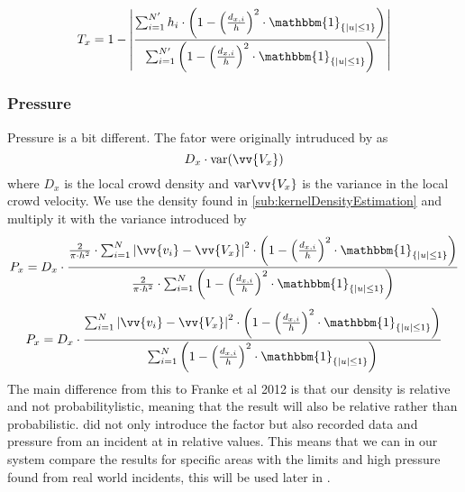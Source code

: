 \begin{equation}
\label{eq:}
T_x = 1 - \left|\frac{\sum_{i=1}^{N'} h_i \cdot \left(1-\left(\frac{d_{x,i}}{h}\right)^2 \cdot \mathbbm{1}_{\{|u| \leq 1\} }\right)}{\sum_{i=1}^{N'} \left(1-\left(\frac{d_{x,i}}{h}\right)^2 \cdot \mathbbm{1}_{\{|u| \leq 1\} }\right)}\right|
\end{equation}

\subsubsection{Pressure}
Pressure is a bit different. The fator were originally intruduced by \citet{empircalstudy} as 
\begin{equation}
D_x \cdot \text{var}(\vv{V_x})
\end{equation}
where $D_x$ is the local crowd density and $\text{var}\vv{V_x}$ is the variance in the local crowd velocity. We use the density found in \cref{sub:kernelDensityEstimation} and multiply it with the variance introduced by \citet{wirz2012inferring}
\begin{equation}
\label{eq:}
P_x = D_x \cdot \frac{\frac{2}{\pi \cdot h^2} \cdot \sum_{i=1}^{N} \left|\vv{v_i} - \vv{V_x}\right|^2 \cdot \left(1-\left(\frac{d_{x,i}}{h}\right)^2 \cdot \mathbbm{1}_{\{|u| \leq 1\} }\right)}{\frac{2}{\pi \cdot h^2} \cdot \sum_{i=1}^{N} \left(1-\left(\frac{d_{x,i}}{h}\right)^2 \cdot \mathbbm{1}_{\{|u| \leq 1\} }\right)}
\end{equation}
\begin{equation}
\label{eq:}
P_x = D_x \cdot \frac{\sum_{i=1}^{N} \left|\vv{v_i} - \vv{V_x}\right|^2 \cdot \left(1-\left(\frac{d_{x,i}}{h}\right)^2 \cdot \mathbbm{1}_{\{|u| \leq 1\} }\right)}{\sum_{i=1}^{N} \left(1-\left(\frac{d_{x,i}}{h}\right)^2 \cdot \mathbbm{1}_{\{|u| \leq 1\} }\right)}
\end{equation}
The main difference from this to Franke et al 2012 is that our density is relative and not probabilitylistic, meaning that the result will also be relative rather than probabilistic.  did not only introduce the factor but also recorded data and pressure from an incident at  in relative values. This means that we can in our system compare the results for specific areas with the limits and high pressure found from real world incidents, this will be used later in .